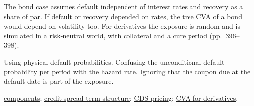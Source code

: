 \begin{qfmethod}
 The bond case assumes default independent of interest rates and recovery as a share of par. If default or recovery depended on rates, the tree CVA of a bond would depend on volatility too. For derivatives the exposure is random and is simulated in a risk-neutral world, with collateral and a cure period (pp.~396--398).

 Using physical default probabilities. Confusing the unconditional default probability per period with the hazard rate. Ignoring that the coupon due at the default date is part of the exposure.

 \hyperref[def:credit-risk-components]{components}; \hyperref[meth:credit-spread-term-structure]{credit spread term structure}; \hyperref[meth:cds-pricing]{CDS pricing}; \hyperref[meth:credit-valuation-adjustment]{CVA for derivatives}.

\end{qfmethod}

